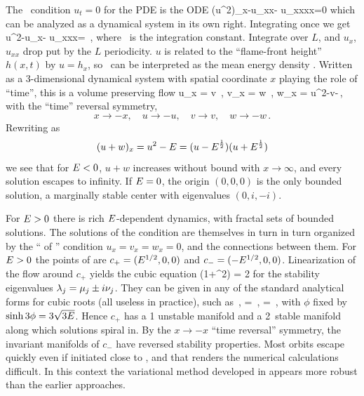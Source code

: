 The \eqv\ condition $u_t=0$ for the {\KSe} PDE  
is the ODE
\beq
(u^2)_x-u_{xx}- u_{xxxx}=0 
which can be analyzed as a dynamical system in its own right.
Integrating once we get
\beq
u^2-u_x- u_{xxx}=\expctE
\,,
\label{eq:stdks}
\eeq
where \expctE\ is the integration constant.
Integrate over $L$, and $u_x$, $u_{xx}$ drop put by the
$L$ periodicity.
$u$ is related to the ``flame-front height'' $h(x,t)$ by
$u=h_x$, so \expctE\ can be interpreted as
the mean energy density .
Written as a 3-dimen\-si\-on\-al dynamical system
with spatial coordinate $x$ playing the role of ``time'',
this is a volume preserving flow
\beq
u_x = v \,,\qquad
v_x = w \,,\qquad
w_x = u^2-v-\expctE \,,
  \label{eq:3dks}
\eeq
with the ``time'' reversal symmetry, 
\[
x \to -x,\quad u \to -u, \quad v \to v, \quad w \to -w \,.
\]
 Rewriting  as
\[
(u+w)_x=u^2-\expctE 
	=(u-\expctE^{1\over 2}) (u+\expctE^{1\over 2}) 
\]
we see that
for $\expctE<0$, $u+w$ increases without bound with $x \to \infty$,
and every solution escapes to infinity.
If $\expctE=0$, the origin $(0,0,0)$ is the
only bounded  solution, a marginally stable center with
eigenvalues $(0, i,-i)$.

For $\expctE>0$ there is rich
$\expctE$-dependent dynamics, with
fractal sets of bounded solutions.
The solutions of the {\eqv}  condition 
 are themselves in turn  in turn organized by the  
``{\eqva}  of {\eqva}''  condition
\( u_x= v_x= w_x= 0 \), and 
the connections between them.
    For $\expctE>0$ the {\eqv}  points of  are
$c_{+}=(\expctE^{1/2},0,0)$ and $c_{-}=(-\expctE^{1/2},0,0)$.
Linearization of the flow around
$c_{+}$ yields the cubic equation
  \beq
\eigExp(1+\eigExp^2) = 2\expctE
for the 
stability eigenvalues 
$\eigExp[j] = \eigRe[j] \pm i \eigIm[j]$.
They can
be given in any of the standard analytical forms for cubic
roots  (all useless in practice), such as
    \,,\qquad
\eigRe=\sinh \phi
\,,\qquad
\eigIm=\cosh \phi \, ,
with $\phi$ fixed by $\sinh 3\phi=3\sqrt{3\expctE}$. 
Hence $c_{+}$ has a {1\dmn}
unstable manifold and a 2\dmn\ stable manifold 
along which solutions spiral in. 
By the $x \to -x$ ``time reversal'' symmetry, the 
invariant manifolds of $c_{-}$ 
have reversed stability properties.
Most orbits escape quickly even if initiated close to \eqva, and that
renders the numerical calculations 
difficult.
In this context the variational method
developed in 
appears more robust than
the earlier approaches.

